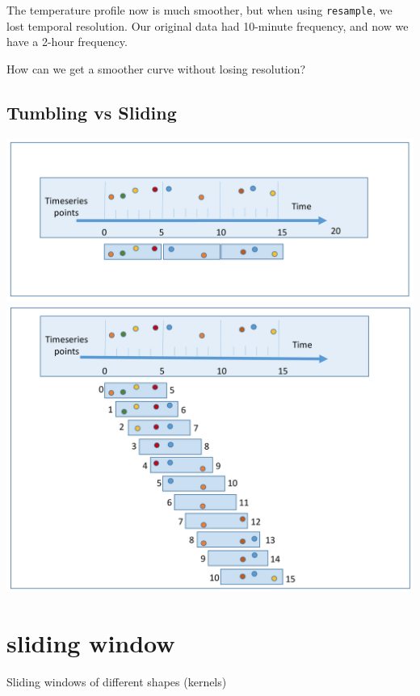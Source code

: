 \documentclass[
  letterpaper,
  DIV=11,
  numbers=noendperiod,
  oneside]{scrreprt}
\begin{document}
The temperature profile now is much smoother, but when using
\texttt{resample}, we lost temporal resolution. Our original data had
10-minute frequency, and now we have a 2-hour frequency.

How can we get a smoother curve without losing resolution?

\hypertarget{tumbling-vs-sliding}{%
\section{Tumbling vs Sliding}\label{tumbling-vs-sliding}}

\includegraphics{smoothing/5sec_tumbling_window.png}
\includegraphics{smoothing/5sec_moving_window.png}

\hypertarget{sliding-window}{%
\chapter{sliding window}\label{sliding-window}}

Sliding windows of different shapes (kernels)

\hfill\break
\end{document}
